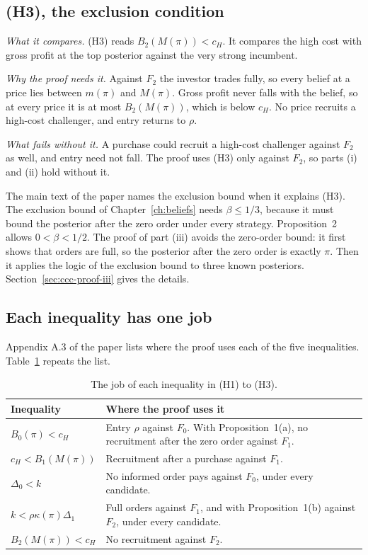 \subsection{(H3), the exclusion condition}

\emph{What it compares.} (H3) reads \(B_2(M(\pi))<c_H\). It compares the high cost with gross profit at the top
posterior against the very strong incumbent.

\emph{Why the proof needs it.} Against \(F_2\) the investor trades fully, so every belief at a price lies between
\(m(\pi)\) and \(M(\pi)\). Gross profit never falls with the belief, so at every price it is at most
\(B_2(M(\pi))\), which is below \(c_H\). No price recruits a high-cost challenger, and entry returns to \(\rho\).

\emph{What fails without it.} A purchase could recruit a high-cost challenger against \(F_2\) as well, and entry
need not fall. The proof uses (H3) only against \(F_2\), so parts (i) and (ii) hold without it.

\begin{watchout}
The main text of the paper names the exclusion bound when it explains (H3). The exclusion bound of
Chapter~\ref{ch:beliefs} needs \(\beta\le1/3\), because it must bound the posterior after the zero order under every
strategy. Proposition~2 allows \(0<\beta<1/2\). The proof of part (iii) avoids the zero-order bound: it first shows
that orders are full, so the posterior after the zero order is exactly \(\pi\). Then it applies the logic of the
exclusion bound to three known posteriors. Section~\ref{sec:ccc-proof-iii} gives the details.
\end{watchout}

\subsection{Each inequality has one job}

Appendix A.3 of the paper lists where the proof uses each of the five inequalities. Table~\ref{tab:ccc-jobs}
repeats the list.

\begin{table}[ht]
\centering
\small
\begin{tabular}{@{}>{\raggedright\arraybackslash}p{3.4cm}>{\raggedright\arraybackslash}p{11.4cm}@{}}
\toprule
Inequality & Where the proof uses it\\
\midrule
\(B_0(\pi)<c_H\) & Entry \(\rho\) against \(F_0\). With Proposition~1(a), no recruitment after the zero order against
\(F_1\).\\
\(c_H<B_1(M(\pi))\) & Recruitment after a purchase against \(F_1\).\\
\(\Delta_0<k\) & No informed order pays against \(F_0\), under every candidate.\\
\(k<\rho\kappa(\pi)\Delta_1\) & Full orders against \(F_1\), and with Proposition~1(b) against \(F_2\), under every
candidate.\\
\(B_2(M(\pi))<c_H\) & No recruitment against \(F_2\).\\
\bottomrule
\end{tabular}
\caption{The job of each inequality in (H1) to (H3).}
\label{tab:ccc-jobs}
\end{table}


